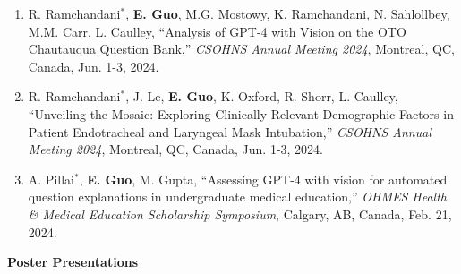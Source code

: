 \documentclass{article}
\begin{document}
\begin{enumerate}
    \item R. Ramchandani$^*$, \textbf{E. Guo}, M.G. Mostowy, K. Ramchandani, N. Sahlollbey, M.M. Carr, L. Caulley, ``Analysis of GPT-4 with Vision on the OTO Chautauqua Question Bank,'' \textit{CSOHNS Annual Meeting 2024}, Montreal, QC, Canada, Jun. 1-3, 2024.
    \item R. Ramchandani$^*$, J. Le, \textbf{E. Guo}, K. Oxford, R. Shorr, L. Caulley, ``Unveiling the Mosaic: Exploring Clinically Relevant Demographic Factors in Patient Endotracheal and Laryngeal Mask Intubation,'' \textit{CSOHNS Annual Meeting 2024}, Montreal, QC, Canada, Jun. 1-3, 2024.
    \item A. Pillai$^*$, \textbf{E. Guo}, M. Gupta, ``Assessing GPT-4 with vision for automated question explanations in undergraduate medical education,'' \textit{OHMES Health \& Medical Education Scholarship Symposium}, Calgary, AB, Canada, Feb. 21, 2024.
\end{enumerate} \vspace{1em}

\textbf{Poster Presentations} \vspace{.5em}
\end{document}
